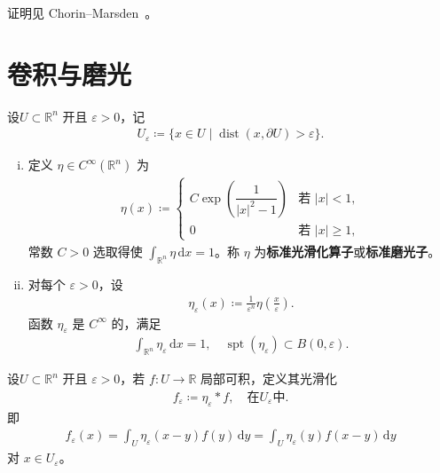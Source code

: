 \documentclass[../main.tex]{subfiles}
\begin{document}
证明见 Chorin--Marsden~\cite{C-M}。

\section{卷积与磨光}\label{section:appC-卷积磨光}

\begin{definition}\label{notation:appC-Ueps}
设$U\subset\mathbb{R}^n$ 开且 $\varepsilon>0$，记
\begin{align*}
U_\varepsilon\coloneqq\{x\in U\mid\operatorname{dist}(x,\partial U)>\varepsilon\}.
\end{align*}
\end{definition}

\begin{definition}\label{definition:appC-磨光子}
\begin{enumerate}[(i)]
\item 定义 $\eta\in C^\infty(\mathbb{R}^n)$ 为
\begin{align*}
\eta(x)\coloneqq
\begin{cases}
C\exp\left(\dfrac{1}{|x|^2-1}\right) & \text{若 } |x|<1,\\
0 & \text{若 } |x|\geqslant 1,
\end{cases}
\end{align*}
常数 $C>0$ 选取得使 $\int_{\mathbb{R}^n}\eta\,\mathrm{d}x=1$。称 $\eta$ 为\textbf{标准光滑化算子}或\textbf{标准磨光子}。

\item 对每个 $\varepsilon>0$，设
\begin{align*}
\eta_\varepsilon(x)\coloneqq\frac{1}{\varepsilon^n}\eta\left(\frac{x}{\varepsilon}\right).
\end{align*}
函数 $\eta_\varepsilon$ 是 $C^\infty$ 的，满足
\begin{align*}
\int_{\mathbb{R}^n}\eta_\varepsilon\,\mathrm{d}x=1,\quad\operatorname{spt}(\eta_\varepsilon)\subset B(0,\varepsilon).
\end{align*}
\end{enumerate}
\end{definition}

\begin{definition}\label{definition:appC-磨光}
设$U\subset\mathbb{R}^n$ 开且 $\varepsilon>0$，若 $f:U\to\mathbb{R}$ 局部可积，定义其光滑化
\begin{align*}
f_\varepsilon\coloneqq\eta_\varepsilon*f,\quad \text{在} U_\varepsilon \text{中}.
\end{align*}
即
\begin{align*}
f_\varepsilon(x)=\int_U\eta_\varepsilon(x-y)f(y)\,\mathrm{d}y=\int_{U}\eta_\varepsilon(y)f(x-y)\,\mathrm{d}y
\end{align*}
对 $x\in U_\varepsilon$。
\end{definition}
\end{document}
